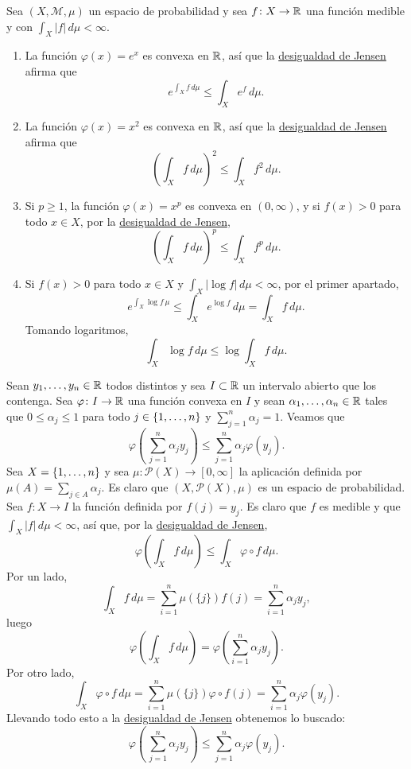 \documentclass[a4paper, 11pt, oneside]{report}
\begin{document}
\begin{example}
  Sea $(X,\mathcal{M},\mu)$ un espacio de probabilidad y sea $f \colon X \to \mathbb R$ una función medible y con $\int_X |f| \, d\mu < \infty$.
  \begin{enumerate}
    \item La función $\varphi(x)=e^x$ es convexa en $\mathbb R$, así que la \hyperref[teo:1.2.1]{\color{c1}desigualdad de Jensen} afirma que
    \[e^{\int_X f \, d\mu} \leq \int_X e^f \, d\mu.\]
    \item La función $\varphi(x)=x^2$ es convexa en $\mathbb R$, así que la \hyperref[teo:1.2.1]{\color{c1}desigualdad de Jensen} afirma que
    \[\left(\int_X f \, d\mu\right)^2 \leq \int_X f^2 \, d\mu.\]
    \item Si $p \geq 1$, la función $\varphi(x)=x^p$ es convexa en $(0,\infty)$, y si $f(x)>0$ para todo $x \in X$, por la \hyperref[teo:1.2.1]{\color{c1}desigualdad de Jensen},
    \[\left(\int_X f \, d\mu\right)^p \leq \int_X f^p \, d\mu.\]
    \item Si $f(x)>0$ para todo $x \in X$ y $\int_X |\log f| \, d\mu < \infty$, por el primer apartado,
    \[e^{\int_X \log f \, \mu} \leq \int_X e^{\log f} \, d\mu = \int_X f \, d\mu.\]
    Tomando logaritmos,
    \[\int_X \log f \, d \mu \leq \log \int_X f \, d\mu.\]
  \end{enumerate}
\end{example}

\begin{example}
  Sean $y_1,\mathellipsis,y_n \in \mathbb R$ todos distintos y sea $I \subset \mathbb R$ un intervalo abierto que los contenga. Sea $\varphi \colon I \to \mathbb R$ una función convexa en $I$ y sean $\alpha_1,\mathellipsis,\alpha_n \in \mathbb R$ tales que $0 \leq \alpha_j \leq 1$ para todo $j \in \{1,\mathellipsis,n\}$ y $\sum_{j=1}^n \alpha_j = 1$. Veamos que
  \[\varphi\left(\, \sum_{j=1}^n \alpha_jy_j\right) \leq \sum_{j=1}^n \alpha_j \varphi(y_j).\]
  Sea $X = \{1,\mathellipsis,n\}$ y sea $\mu \colon \mathcal{P}(X) \to [0,\infty]$ la aplicación definida por $\mu(A)=\sum_{j \in A}\alpha_j$. Es claro que $(X,\mathcal{P}(X),\mu)$ es un espacio de probabilidad. Sea $f \colon X \to I$ la función definida por $f(j)=y_j$. Es claro que $f$ es medible y que $\int_X |f|\, d\mu < \infty$, así que, por la \hyperref[teo:1.2.1]{\color{c1}desigualdad de Jensen},
  \[\varphi\left(\int_X f \, d\mu\right) \leq \int_X \varphi \circ f \, d\mu.\]
  Por un lado,
  \[\int_X f \, d\mu = \sum_{i=1}^n \mu(\{j\})f(j)=\sum_{i=1}^n\alpha_jy_j,\]
  luego
  \[\varphi\left(\int_X f \, d\mu\right) = \varphi\left(\sum_{i=1}^n \alpha_jy_j\right).\]
  Por otro lado,
  \[\int_X \varphi \circ f \, d\mu = \sum_{i=1}^n \mu(\{j\})\varphi \circ f (j) = \sum_{i=1}^n \alpha_j \varphi(y_j).\]
  Llevando todo esto a la \hyperref[teo:1.2.1]{\color{c1}desigualdad de Jensen} obtenemos lo buscado:
  \[\varphi\left(\, \sum_{j=1}^n \alpha_jy_j\right) \leq \sum_{j=1}^n \alpha_j \varphi(y_j).\]
\end{example}
\end{document}
